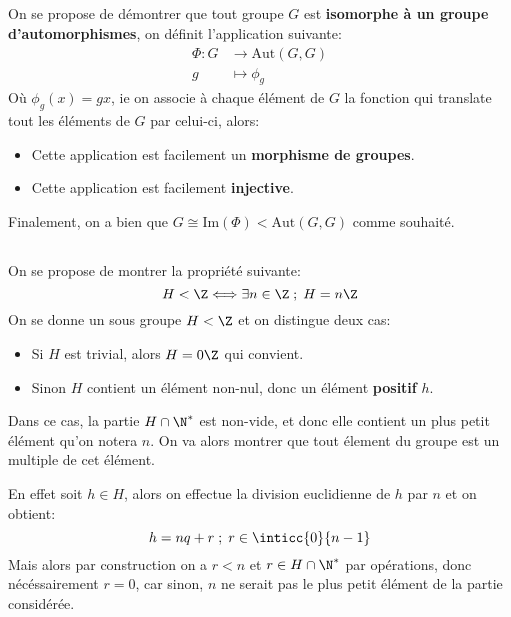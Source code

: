 \documentclass{report}
\begin{document}
      \subsection*{}
         On se propose de démontrer que tout groupe \(G\) est \textbf{isomorphe à un groupe d'automorphismes}, on définit l'application suivante:
         \[
            \begin{aligned}
               \Phi : G &\longrightarrow \text{Aut}(G, G)\\
               g &\longmapsto \phi_g
            \end{aligned}
         \]
         Où \(\phi_g(x) = gx\), ie on associe à chaque élément de \(G\) la fonction qui translate tout les éléments de \(G\) par celui-ci, alors:
         \begin{itemize}
            \item Cette application est facilement un \textbf{morphisme de groupes}.
            \item Cette application est facilement \textbf{injective}.
         \end{itemize}
         Finalement, on a bien que \(G \cong \text{Im}(\Phi) < \text{Aut}(G, G)\) comme souhaité.
      \subsection*{}
         On se propose de montrer la propriété suivante:
         \[
            H < \Z \Longleftrightarrow \exists n \in \Z \; ; \; H = n\Z
         \]
         On se donne un sous groupe \(H < \Z\) et on distingue deux cas:
         \begin{itemize}
            \item Si \(H\) est trivial, alors \(H = 0\Z\) qui convient.
            \item Sinon \(H\) contient un élément non-nul, donc un élément \textbf{positif} \(h\).
         \end{itemize}
         Dans ce cas, la partie \(H \cap \N^*\) est non-vide, et donc elle contient un plus petit élément qu'on notera \(n\). On va alors montrer que tout élement du groupe est un multiple de cet élément.\<

         En effet soit \(h \in H\), alors on effectue la division euclidienne de \(h\) par \(n\) et on obtient:
         \[
            h = nq + r \; ; \; r \in \inticc{0}{n-1}
         \]
         Mais alors par construction on a \(r < n\) et \(r \in H \cap \N^*\) par opérations, donc nécéssairement \(r = 0\), car sinon, \(n\) ne serait pas le plus petit élément de la partie considérée.
\end{document}
